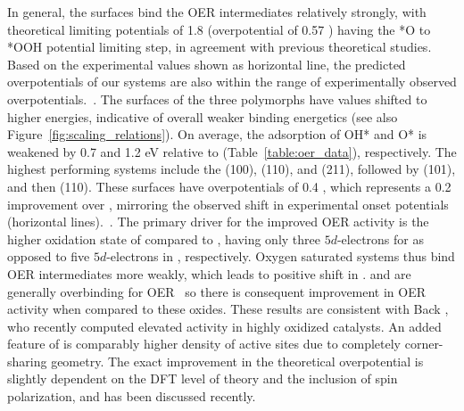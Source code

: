 %
In general, the \rIrOtwo surfaces bind the OER intermediates relatively strongly, with theoretical limiting potentials of \mytilde\num{1.8} \VRHE (overpotential of \num{0.57} \VRHE) having the *O to *OOH potential limiting step, in agreement with previous theoretical studies.~\cite{Briquet2017,Strickler2019,Raman2020}
%
Based on the experimental values shown as horizontal line, the predicted overpotentials of our \rIrOtwo systems are also within the range of experimentally observed overpotentials.~\cite{Seitz2016, Kuo2017}.
%
The surfaces of the three \IrOthree polymorphs have \DGOmOH values shifted to higher energies, indicative of overall weaker binding energetics (see also Figure~\ref{fig:scaling_relations}).
%
On average, the adsorption of OH* and O* is weakened by 0.7 and 1.2 eV relative to \IrOtwo (Table~\ref{table:oer_data}), respectively.
%
The highest performing systems include the \aIrOthree (100), (110), and (211), followed by \bIrOthree (101), and then \rIrOthree (110).
%
These surfaces have overpotentials of \mytilde\num{0.4} \VRHE,
which represents a \mytilde\num{0.2} \VRHE improvement over \rIrOtwo, mirroring the observed shift in experimental onset potentials (horizontal lines).~\cite{Seitz2016, Kuo2017}.
%
The primary driver for the improved OER activity is the higher oxidation state of \IrOthree compared to \IrOtwo, having only three $5d$-electrons for  as opposed to five $5d$-electrons in  , respectively.
%
Oxygen saturated \IrOthree systems thus bind OER intermediates more weakly, which leads to positive shift in \DGOmOH.
%
\IrOtwo and \RhOtwo are generally overbinding for OER~\cite{Dickens2019} so there is consequent improvement in OER activity when compared to these oxides.
%
These results are consistent with Back , who recently computed elevated activity in highly oxidized \IrOthree catalysts.\cite{Back2019}
%
An added feature of \aIrOthree is comparably higher density of active sites due to completely corner-sharing geometry.
%
The exact improvement in the theoretical overpotential is slightly dependent on the DFT level of theory and the inclusion of spin polarization, and has been discussed recently.~\cite{Seitz2016,Strickler2019}
